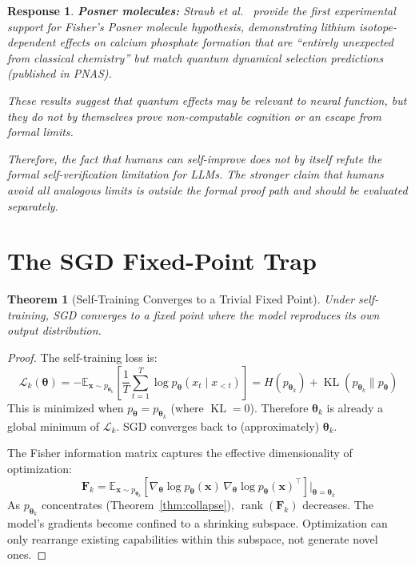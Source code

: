 \documentclass[11pt,a4paper]{article}
\newtheorem{theorem}{Theorem}[section]
\newtheorem{response}{Response}
\DeclareMathOperator{\KL}{KL}
\DeclareMathOperator{\rank}{rank}
\begin{document}
\begin{response}
\textbf{Posner molecules:} Straub et al.~\cite{straub2025posner} provide the first experimental support for Fisher's Posner molecule hypothesis, demonstrating lithium isotope-dependent effects on calcium phosphate formation that are ``entirely unexpected from classical chemistry'' but match quantum dynamical selection predictions (published in PNAS).

These results suggest that quantum effects may be relevant to neural function, but they do not by themselves prove non-computable cognition or an escape from formal limits.

Therefore, the fact that humans can self-improve does not by itself refute the formal self-verification limitation for LLMs. The stronger claim that humans avoid all analogous limits is outside the formal proof path and should be evaluated separately.
\end{response}

\section{The SGD Fixed-Point Trap}

\begin{theorem}[Self-Training Converges to a Trivial Fixed Point]
\label{thm:sgd_fixed}
Under self-training, SGD converges to a fixed point where the model reproduces its own output distribution.
\end{theorem}

\begin{proof}
The self-training loss is:
\begin{equation}
\mathcal{L}_k(\bm{\theta}) = -\mathbb{E}_{\bm{x} \sim p_{\bm{\theta}_k}}\!\left[\frac{1}{T}\sum_{t=1}^{T} \log p_{\bm{\theta}}(x_t \mid x_{<t})\right] = H(p_{\bm{\theta}_k}) + \KL(p_{\bm{\theta}_k} \| p_{\bm{\theta}})
\end{equation}
This is minimized when $p_{\bm{\theta}} = p_{\bm{\theta}_k}$ (where $\KL = 0$). Therefore $\bm{\theta}_k$ is already a global minimum of $\mathcal{L}_k$. SGD converges back to (approximately) $\bm{\theta}_k$.

The Fisher information matrix captures the effective dimensionality of optimization:
\begin{equation}
\bm{F}_k = \mathbb{E}_{\bm{x} \sim p_{\bm{\theta}_k}}\!\left[\nabla_{\bm{\theta}} \log p_{\bm{\theta}}(\bm{x})\, \nabla_{\bm{\theta}} \log p_{\bm{\theta}}(\bm{x})^\top\right]\bigg|_{\bm{\theta} = \bm{\theta}_k}
\end{equation}
As $p_{\bm{\theta}_k}$ concentrates (Theorem~\ref{thm:collapse}), $\rank(\bm{F}_k)$ decreases. The model's gradients become confined to a shrinking subspace. Optimization can only rearrange existing capabilities within this subspace, not generate novel ones.
\end{proof}
\end{document}

